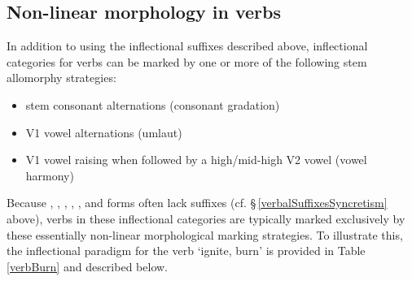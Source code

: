 \subsection{Non-linear morphology in verbs}\label{nonLinearMorphVerbs}
In addition to using the inflectional suffixes described above, inflectional categories for verbs can be marked %
by one or more of the following stem allomorphy strategies: %
\begin{itemize}
\item{stem consonant alternations (consonant gradation)}
\item{V1 vowel alternations (umlaut)}
\item{V1 vowel raising when followed by a high/mid-high V2 vowel (vowel harmony)}
\end{itemize}
Because , , , , ,  and  forms often lack suffixes (cf. §\,\ref{verbalSuffixesSyncretism} above), verbs in these inflectional categories are typically marked exclusively by these essentially non-linear morphological marking strategies. 
To illustrate this, the inflectional paradigm for the verb  ‘ignite, burn’ is provided in Table \vref{verbBurn} and described below. 
\renewcommand{\Xp}[1]{\MC{1}{x{90pt}}{#1}}%
